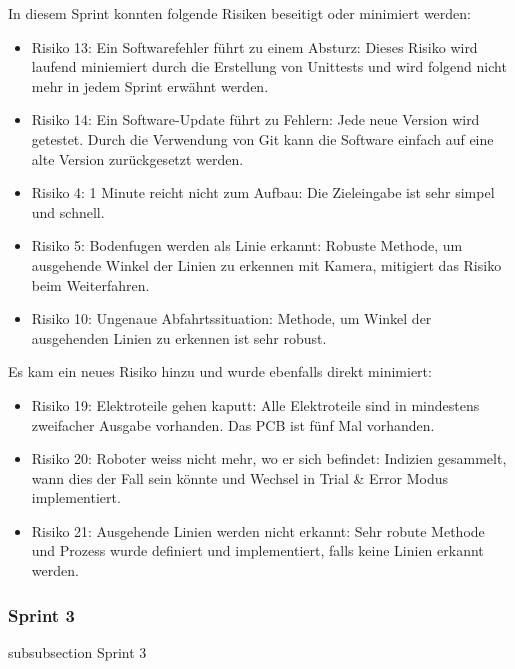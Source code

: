 In diesem Sprint konnten folgende Risiken beseitigt oder minimiert werden:
\begin{itemize}
    \item Risiko 13: Ein Softwarefehler führt zu einem Absturz: Dieses Risiko wird laufend miniemiert durch die Erstellung von Unittests und wird folgend nicht mehr in jedem Sprint erwähnt werden.
    \item Risiko 14: Ein Software-Update führt zu Fehlern: Jede neue Version wird getestet. Durch die Verwendung von Git kann die Software einfach auf eine alte Version zurückgesetzt werden. 
    \item Risiko 4: 1 Minute reicht nicht zum Aufbau: Die Zieleingabe ist sehr simpel und schnell.
    \item Risiko 5: Bodenfugen werden  als Linie erkannt: Robuste Methode, um ausgehende Winkel der Linien zu erkennen mit Kamera, mitigiert das Risiko beim Weiterfahren.
    \item Risiko 10: Ungenaue Abfahrtssituation: Methode, um Winkel der ausgehenden Linien zu erkennen ist sehr robust.
\end{itemize}

Es kam ein neues Risiko hinzu und wurde ebenfalls direkt minimiert:
\begin{itemize}
    \item Risiko 19: Elektroteile gehen kaputt: Alle Elektroteile sind in mindestens zweifacher Ausgabe vorhanden. Das PCB ist fünf Mal vorhanden.
    \item Risiko 20: Roboter weiss nicht mehr, wo er sich befindet: Indizien gesammelt, wann dies der Fall sein könnte und Wechsel in Trial \& Error Modus implementiert.
    \item Risiko 21: Ausgehende Linien werden nicht erkannt: Sehr robute Methode und Prozess wurde definiert und implementiert, falls keine Linien erkannt werden.
\end{itemize}
\newpage

\subsubsection*{Sprint 3}
    {subsubsection}
    {Sprint 3}

